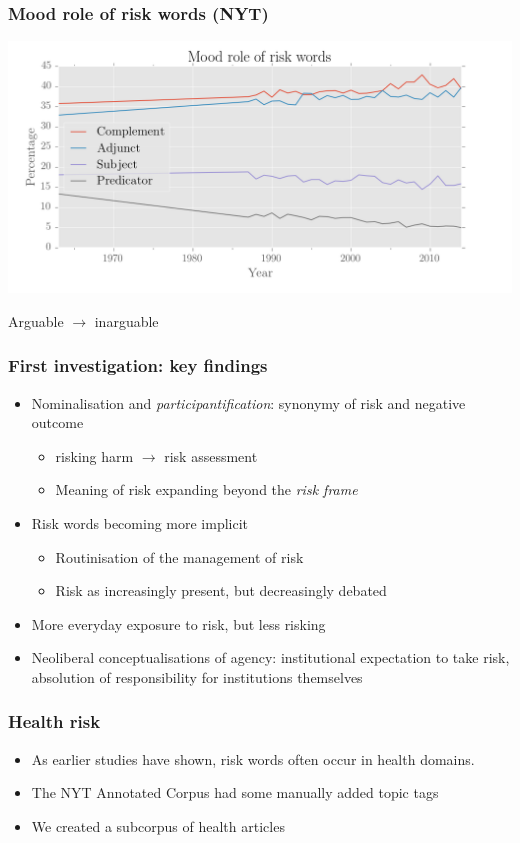 \documentclass{beamer}       %
\begin{document}
\begin{frame}
    \frametitle{Mood role of risk words (NYT)}
    \centering
    \includegraphics[width=1\textwidth]{../../images/mood-role-of-risk-words}

    Arguable $\rightarrow$ inarguable
\end{frame}


\begin{frame}
    \frametitle{First investigation: key findings}
    
    \begin{itemize}
    \item Nominalisation and \emph{participantification}: synonymy of risk and negative outcome
    \begin{itemize}
        \item risking harm $\rightarrow$ risk assessment
        \item Meaning of risk expanding beyond the \emph{risk frame}
    \end{itemize}
    \item Risk words becoming more implicit
    \begin{itemize}
        \item Routinisation of the management of risk
        \item Risk as increasingly present, but decreasingly debated
    \end{itemize}
    \item More everyday exposure to risk, but less risking
    \item Neoliberal conceptualisations of agency: institutional expectation to take risk, absolution of responsibility for institutions themselves
    \end{itemize}
\end{frame}

\begin{frame}\frametitle{Health risk}

\begin{itemize}
\item As earlier studies have shown, risk words often occur in health domains.
\item The NYT Annotated Corpus had some manually added topic tags
\item We created a subcorpus of health articles
\end{itemize}
\end{frame}
\end{document}
